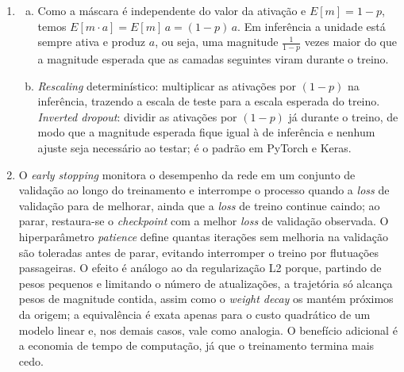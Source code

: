 \documentclass{dlproblemset}
\begin{document}
\begin{enumerate}[1)]
    \item
    \begin{enumerate}[a)]
        \item Como a máscara é independente do valor da ativação e $E[m] = 1-p$, temos $E[m \cdot a] = E[m]\,a = (1-p)\,a$. Em inferência a unidade está sempre ativa e produz $a$, ou seja, uma magnitude $\frac{1}{1-p}$ vezes maior do que a magnitude esperada que as camadas seguintes viram durante o treino.
        \item \textit{Rescaling} determinístico: multiplicar as ativações por $(1-p)$ na inferência, trazendo a escala de teste para a escala esperada do treino. \textit{Inverted dropout}: dividir as ativações por $(1-p)$ já durante o treino, de modo que a magnitude esperada fique igual à de inferência e nenhum ajuste seja necessário ao testar; é o padrão em PyTorch e Keras.
    \end{enumerate}

    \item O \textit{early stopping} monitora o desempenho da rede em um conjunto de validação ao longo do treinamento e interrompe o processo quando a \textit{loss} de validação para de melhorar, ainda que a \textit{loss} de treino continue caindo; ao parar, restaura-se o \textit{checkpoint} com a melhor \textit{loss} de validação observada. O hiperparâmetro \textit{patience} define quantas iterações sem melhoria na validação são toleradas antes de parar, evitando interromper o treino por flutuações passageiras. O efeito é análogo ao da regularização L2 porque, partindo de pesos pequenos e limitando o número de atualizações, a trajetória só alcança pesos de magnitude contida, assim como o \textit{weight decay} os mantém próximos da origem; a equivalência é exata apenas para o custo quadrático de um modelo linear e, nos demais casos, vale como analogia. O benefício adicional é a economia de tempo de computação, já que o treinamento termina mais cedo.


\end{enumerate}
\end{document}
